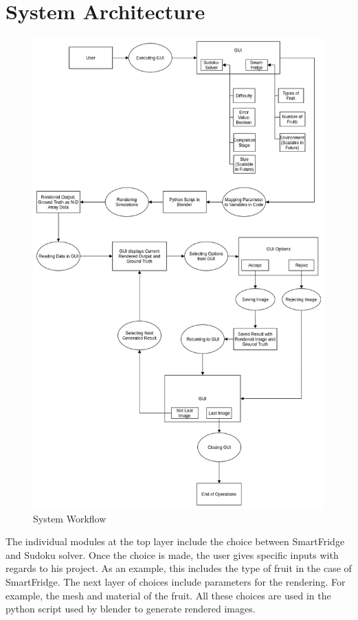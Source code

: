 \documentclass[a4paper,12pt]{article}
\begin{document}
\section{System Architecture}
\begin{figure}[H]
\includegraphics[scale=0.5]{system_workflow.png}
\caption{System Workflow}
\end{figure}
The individual modules at the top layer include the choice between SmartFridge and Sudoku solver. Once the choice is made, the user gives specific inputs with regards to his project. As an example, this includes the type of fruit in the case of SmartFridge. The next layer of choices include parameters for the rendering. For example, the mesh and material of the fruit. All these choices are used in the python script used by blender to generate rendered images.
\end{document}
